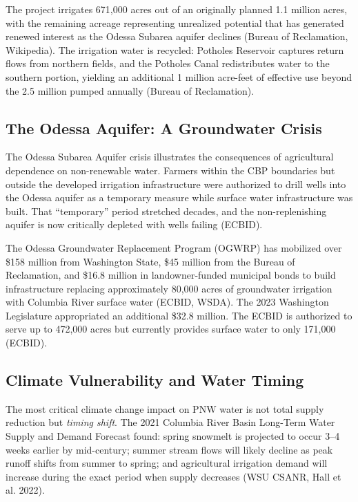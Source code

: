 \documentclass[11pt,letterpaper]{article}
\begin{document}
The project irrigates 671,000 acres out of an originally planned 1.1 million acres, with the remaining acreage representing unrealized potential that has generated renewed interest as the Odessa Subarea aquifer declines (Bureau of Reclamation, Wikipedia). The irrigation water is recycled: Potholes Reservoir captures return flows from northern fields, and the Potholes Canal redistributes water to the southern portion, yielding an additional 1 million acre-feet of effective use beyond the 2.5 million pumped annually (Bureau of Reclamation).

\subsection{The Odessa Aquifer: A Groundwater Crisis}

The Odessa Subarea Aquifer crisis illustrates the consequences of agricultural dependence on non-renewable water. Farmers within the CBP boundaries but outside the developed irrigation infrastructure were authorized to drill wells into the Odessa aquifer as a temporary measure while surface water infrastructure was built. That ``temporary'' period stretched decades, and the non-replenishing aquifer is now critically depleted with wells failing (ECBID).

The Odessa Groundwater Replacement Program (OGWRP) has mobilized over \$158 million from Washington State, \$45 million from the Bureau of Reclamation, and \$16.8 million in landowner-funded municipal bonds to build infrastructure replacing approximately 80,000 acres of groundwater irrigation with Columbia River surface water (ECBID, WSDA). The 2023 Washington Legislature appropriated an additional \$32.8 million. The ECBID is authorized to serve up to 472,000 acres but currently provides surface water to only 171,000 (ECBID).

\subsection{Climate Vulnerability and Water Timing}

The most critical climate change impact on PNW water is not total supply reduction but \textit{timing shift}. The 2021 Columbia River Basin Long-Term Water Supply and Demand Forecast found: spring snowmelt is projected to occur 3--4 weeks earlier by mid-century; summer stream flows will likely decline as peak runoff shifts from summer to spring; and agricultural irrigation demand will increase during the exact period when supply decreases (WSU CSANR, Hall et al. 2022).
\end{document}
